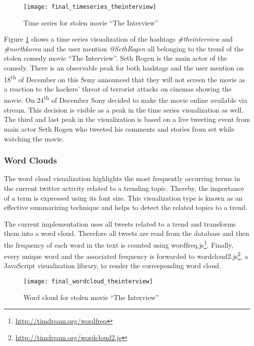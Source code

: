 \begin{figure}[H]
  \centering
        \texttt{[image: final\_timeseries\_theinterview]}
  \caption[Time series for stolen movie \enquote{The Interview}]{Time series for stolen movie \enquote{The Interview}}
  \label{fig:time-series-interview}
  \vspace{-1.3em}
\end{figure}

Figure \ref{fig:time-series-interview} shows a time series visualization of the hashtags \textit{\#theinterview} and \textit{\#northkorea} and the user mention \textit{@SethRogen} all belonging to the trend of the stolen comedy movie \enquote{The Interview}. Seth Rogen is the main actor of the comedy. There is an observable peak for both hashtags and the user mention on 18\textsuperscript{th} of December on this Sony announced that they will not screen the movie as a reaction to the hackers' threat of terrorist attacks on cinemas showing the movie. On 24\textsuperscript{th} of December Sony decided to make the movie online available via stream. This decision is visible as a peak in the time series visualization as well. The third and last peak in the visualization is based on a live tweeting event from main actor Seth Rogen who tweeted his comments and stories from set while watching the movie. \cite{deadline2014interview}

\subsubsection{Word Clouds}
\label{subsubsec:vis-word-clouds}
The word cloud visualization highlights the most frequently occurring terms in the current twitter activity related to a trending topic. Thereby, the importance of a term is expressed using its font size. This visualization type is known as an effective summarizing technique and helps to detect the related topics to a trend.

The current implementation uses all tweets related to a trend and transforms them into a word cloud. Therefore all tweets are read from the database and then the frequency of each word in the text is counted using wordfreq.js\footnote{\url{http://timdream.org/wordfreq} \accessednote}. Finally, every unique word and the associated frequency is forwarded to wordcloud2.js\footnote{\url{http://timdream.org/wordcloud2.js} \accessednote}, a JavaScript visualization library, to render the corresponding word cloud.

\begin{figure}[H]
  \centering
        \texttt{[image: final\_wordcloud\_theinterview]}
  \caption[Word cloud for stolen movie \enquote{The Interview}]{Word cloud for stolen movie \enquote{The Interview}}
  \label{fig:word-cloud-interview}
  \vspace{-1.3em}
\end{figure}

